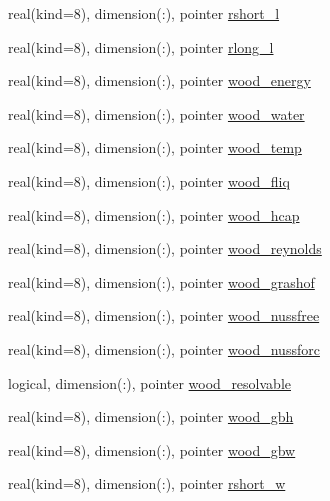 \begin{DoxyCompactItemize}
\item 
real(kind=8), dimension(\+:), pointer \hyperlink{structrk4__coms_1_1rk4patchtype_a79fc3ef3001c54553309fa162c633aeb}{rshort\+\_\+l}
\item 
real(kind=8), dimension(\+:), pointer \hyperlink{structrk4__coms_1_1rk4patchtype_a9efd30ff1eef677965f421c035ad8354}{rlong\+\_\+l}
\item 
real(kind=8), dimension(\+:), pointer \hyperlink{structrk4__coms_1_1rk4patchtype_a76ce9b8ef17ed947c8840574c5fdf76f}{wood\+\_\+energy}
\item 
real(kind=8), dimension(\+:), pointer \hyperlink{structrk4__coms_1_1rk4patchtype_a4c6e061bf65085ce6445671b92c3ace8}{wood\+\_\+water}
\item 
real(kind=8), dimension(\+:), pointer \hyperlink{structrk4__coms_1_1rk4patchtype_a0ef42b363364eaa0322ad3063ff11b4b}{wood\+\_\+temp}
\item 
real(kind=8), dimension(\+:), pointer \hyperlink{structrk4__coms_1_1rk4patchtype_ac1eca232f33dda8a7f4c8a1d02fe390a}{wood\+\_\+fliq}
\item 
real(kind=8), dimension(\+:), pointer \hyperlink{structrk4__coms_1_1rk4patchtype_a9f554027d33ebe10e8612b6e910b7b68}{wood\+\_\+hcap}
\item 
real(kind=8), dimension(\+:), pointer \hyperlink{structrk4__coms_1_1rk4patchtype_abac91caa82c29491b90ec86be33dd3dc}{wood\+\_\+reynolds}
\item 
real(kind=8), dimension(\+:), pointer \hyperlink{structrk4__coms_1_1rk4patchtype_ad3b0f7569e044781e44ecc8a0ef7ad10}{wood\+\_\+grashof}
\item 
real(kind=8), dimension(\+:), pointer \hyperlink{structrk4__coms_1_1rk4patchtype_af060a130c83b41fcc8003a4c211d200b}{wood\+\_\+nussfree}
\item 
real(kind=8), dimension(\+:), pointer \hyperlink{structrk4__coms_1_1rk4patchtype_a579ea9033b54dbcca335975c35eb0a01}{wood\+\_\+nussforc}
\item 
logical, dimension(\+:), pointer \hyperlink{structrk4__coms_1_1rk4patchtype_aa9b0c1eb8b423c84f730d5cb9788e73d}{wood\+\_\+resolvable}
\item 
real(kind=8), dimension(\+:), pointer \hyperlink{structrk4__coms_1_1rk4patchtype_aa3ab89eb776465245caf5860e53c037c}{wood\+\_\+gbh}
\item 
real(kind=8), dimension(\+:), pointer \hyperlink{structrk4__coms_1_1rk4patchtype_a7a33ddd24476b4828708926103469fcc}{wood\+\_\+gbw}
\item 
real(kind=8), dimension(\+:), pointer \hyperlink{structrk4__coms_1_1rk4patchtype_a3e8a8658a3c69b191cacf5f2a79cfe64}{rshort\+\_\+w}

\end{DoxyCompactItemize}
